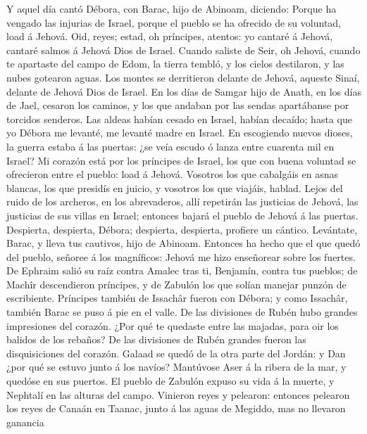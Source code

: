  Y aquel día cantó Débora, con Barac, hijo de Abinoam,
diciendo:  Porque ha vengado las injurias de Israel, porque
el pueblo se ha ofrecido de su voluntad, load á Jehová. 
Oid, reyes; estad, oh príncipes, atentos: yo cantaré á Jehová, cantaré
salmos á Jehová Dios de Israel.  Cuando saliste de Seir, oh
Jehová, cuando te apartaste del campo de Edom, la tierra tembló, y los
cielos destilaron, y las nubes gotearon aguas.  Los montes
se derritieron delante de Jehová, aqueste Sinaí, delante de Jehová Dios
de Israel.  En los días de Samgar hijo de Anath, en los días
de Jael, cesaron los caminos, y los que andaban por las sendas
apartábanse por torcidos senderos.  Las aldeas habían cesado
en Israel, habían decaído; hasta que yo Débora me levanté, me levanté
madre en Israel.  En escogiendo nuevos dioses, la guerra
estaba á las puertas: ¿se veía escudo ó lanza entre cuarenta mil en
Israel?  Mi corazón está por los príncipes de Israel, los
que con buena voluntad se ofrecieron entre el pueblo: load á Jehová.
 Vosotros los que cabalgáis en asnas blancas, los que
presidís en juicio, y vosotros los que viajáis, hablad. 
Lejos del ruido de los archeros, en los abrevaderos, allí repetirán las
justicias de Jehová, las justicias de sus villas en Israel; entonces
bajará el pueblo de Jehová á las puertas.  Despierta,
despierta, Débora; despierta, despierta, profiere un cántico. Levántate,
Barac, y lleva tus cautivos, hijo de Abinoam.  Entonces ha
hecho que el que quedó del pueblo, señoree á los magníficos: Jehová me
hizo enseñorear sobre los fuertes.  De Ephraim salió su
raíz contra Amalec tras ti, Benjamín, contra tus pueblos; de Machîr
descendieron príncipes, y de Zabulón los que solían manejar punzón de
escribiente.  Príncipes también de Issachâr fueron con
Débora; y como Issachâr, también Barac se puso á pie en el valle. De las
divisiones de Rubén hubo grandes impresiones del corazón. 
¿Por qué te quedaste entre las majadas, para oir los balidos de los
rebaños? De las divisiones de Rubén grandes fueron las disquisiciones
del corazón.  Galaad se quedó de la otra parte del Jordán:
y Dan ¿por qué se estuvo junto á los navíos? Mantúvose Aser á la ribera
de la mar, y quedóse en sus puertos.  El pueblo de Zabulón
expuso su vida á la muerte, y Nephtalí en las alturas del campo.
 Vinieron reyes y pelearon: entonces pelearon los reyes de
Canaán en Taanac, junto á las aguas de Megiddo, mas no llevaron ganancia
